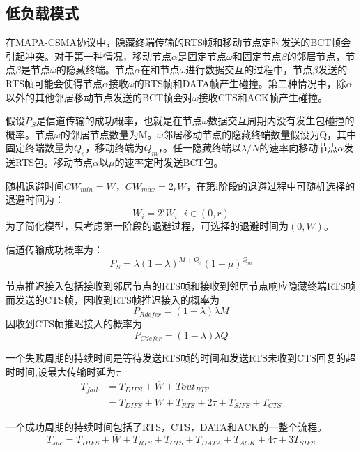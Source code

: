 \subsection {低负载模式}
在MAPA-CSMA协议中，隐藏终端传输的RTS帧和移动节点定时发送的BCT帧会引起冲突。对于第一种情况，移动节点$\alpha$是固定节点$\omega$和固定节点$\beta$的邻居节点，节点$\beta$是节点$\omega$的隐藏终端。节点$\alpha$在和节点$\omega$进行数据交互的过程中，节点$\beta$发送的RTS帧可能会使得节点$\alpha$接收$\omega$的RTS帧和DATA帧产生碰撞。第二种情况中，除$\alpha$以外的其他邻居移动节点发送的BCT帧会对$\omega$接收CTS和ACK帧产生碰撞。

假设$P_S$是信道传输的成功概率，也就是在节点$\omega$数据交互周期内没有发生包碰撞的概率。节点$\omega$的邻居节点数量为M。$\omega$邻居移动节点的隐藏终端数量假设为Q，其中固定终端数量为$Q_s$，移动终端为$Q_m$，。任一隐藏终端以$\lambda/N$的速率向移动节点$\alpha$发送RTS包。移动节点$\alpha$以$\mu$的速率定时发送BCT包。

随机退避时间$CW_{min}=W$，$CW_{max}=2_r W$，在第i阶段的退避过程中可随机选择的退避时间为：
\begin{equation}
W_i=2^iW_i \ \ \ i\in(0,r)
\end{equation}
为了简化模型，只考虑第一阶段的退避过程，可选择的退避时间为$(0,W)$。

信道传输成功概率为：
\begin{equation}
P_S=\lambda(1-\lambda)^{M+Q_s}(1-\mu)^{Q_m}
\end{equation}

节点推迟接入包括接收到邻居节点的RTS帧和接收到邻居节点响应隐藏终端RTS帧而发送的CTS帧，因收到RTS帧推迟接入的概率为
\begin{equation}
 P_{Rdefer}=(1-\lambda)\lambda M
\end{equation}
因收到CTS帧推迟接入的概率为
\begin{equation}
 P_{Cdefer}=(1-\lambda)\lambda Q
\end{equation}

一个失败周期的持续时间是等待发送RTS帧的时间和发送RTS未收到CTS回复的超时时间,设最大传输时延为$\tau$
\begin{equation}
\begin{aligned}
T_{fail}&=T_{DIFS}+\overline W+Tout_{RTS}\\
&=T_{DIFS}+\overline W+T_{RTS}+2\tau+T_{SIFS}+T_{CTS}
\end{aligned}
\end{equation}

一个成功周期的持续时间包括了RTS，CTS，DATA和ACK的一整个流程。
\begin{equation}
T_{suc}=T_{DIFS}+\overline W+T_{RTS}+T_{CTS}+T_{DATA}+T_{ACK}+4\tau+3T_{SIFS}
\end{equation}

